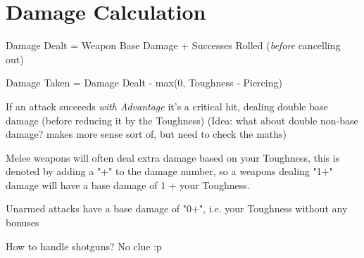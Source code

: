 \section{Damage Calculation}

Damage Dealt = Weapon Base Damage + Successes Rolled (\textit{before} cancelling out)

Damage Taken = Damage Dealt - max(0, Toughness - Piercing) 

If an attack succeeds \textit{with Advantage} it's a critical hit, dealing double base damage (before reducing it by the Toughness)
(Idea: what about double non-base damage? makes more sense sort of, but need to check the maths)

Melee weapons will often deal extra damage based on your Toughness, this is denoted by adding a "+" to the damage number, so a weapons dealing "1+" damage will have a base damage of 1 + your Toughness.

Unarmed attacks have a base damage of "0+", i.e. your Toughness without any bonuses


How to handle shotguns? No clue :p


